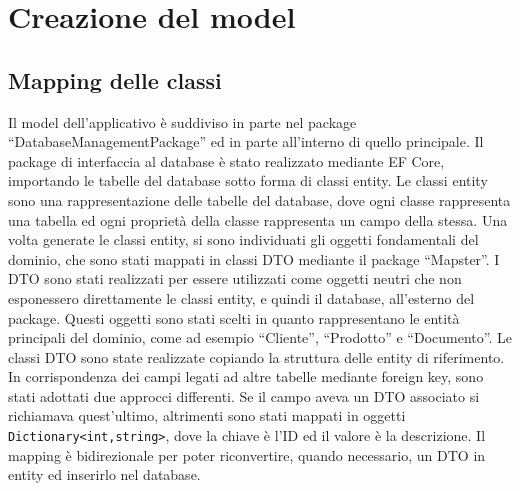 \chapter{Creazione del model}\label{chap:Model}
\section{Mapping delle classi}
Il model dell'applicativo è suddiviso in parte nel package
``DatabaseManagementPackage'' ed in parte all'interno di quello principale.
Il package di interfaccia al database è stato realizzato mediante \ac{EF Core},
importando le tabelle del database sotto forma di classi entity.
Le classi entity sono una rappresentazione delle tabelle del database, dove ogni classe rappresenta una tabella
ed ogni proprietà della classe rappresenta un campo della stessa.
Una volta generate le classi entity, si sono individuati gli oggetti fondamentali del dominio,
che sono stati mappati in classi \ac{DTO} mediante il package ``Mapster''.
I \ac{DTO} sono stati realizzati per essere utilizzati come oggetti neutri che non
esponessero direttamente le classi entity, e quindi il database, all'esterno del package.
Questi oggetti sono stati scelti in quanto rappresentano le entità principali del dominio,
come ad esempio ``Cliente'', ``Prodotto'' e ``Documento''.
Le classi \ac{DTO} sono state realizzate copiando la struttura delle entity di riferimento.
In corrispondenza dei campi legati ad altre tabelle mediante foreign key, sono stati adottati due approcci differenti.
Se il campo aveva un \ac{DTO} associato si richiamava quest'ultimo,
altrimenti sono stati mappati in oggetti \texttt{Dictionary<int,string>}, dove la chiave è l'\ac{ID} ed il valore è la descrizione.
Il mapping è bidirezionale per poter riconvertire, quando necessario, un \ac{DTO} in entity ed inserirlo nel database.
